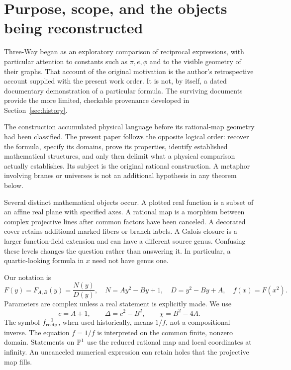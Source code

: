 \section{Purpose, scope, and the objects being reconstructed}\label{sec:intro}

Three-Way began as an exploratory comparison of reciprocal expressions, with particular attention to constants such as \(\pi,e,\phi\) and to the visible geometry of their graphs. That account of the original motivation is the author's retrospective account supplied with the present work order. It is not, by itself, a dated documentary demonstration of a particular formula. The surviving documents provide the more limited, checkable provenance developed in Section~\ref{sec:history}.

The construction accumulated physical language before its rational-map geometry had been classified. The present paper follows the opposite logical order: recover the formula, specify its domains, prove its properties, identify established mathematical structures, and only then delimit what a physical comparison actually establishes. Its subject is the original rational construction. A metaphor involving branes or universes is not an additional hypothesis in any theorem below.

Several distinct mathematical objects occur. A plotted real function is a subset of an affine real plane with specified axes. A rational map is a morphism between complex projective lines after common factors have been canceled. A decorated cover retains additional marked fibers or branch labels. A Galois closure is a larger function-field extension and can have a different source genus. Confusing these levels changes the question rather than answering it. In particular, a quartic-looking formula in \(x\) need not have genus one.

Our notation is
\begin{equation}\label{eq:family}
F(y)=F_{A,B}(y)=\frac{N(y)}{D(y)},\quad
N=Ay^2-By+1,\quad D=y^2-By+A,\quad f(x)=F(x^2).
\end{equation}
Parameters are complex unless a real statement is explicitly made. We use
\begin{equation}\label{eq:parameters}
c=A+1,\qquad \Delta=c^2-B^2,\qquad \chi=B^2-4A.
\end{equation}
The symbol \(f^{-1}_{\rm recip}\), when used historically, means \(1/f\), not a compositional inverse. The equation \(f=1/f\) is interpreted on the common finite, nonzero domain. Statements on \(\mathbb P^1\) use the reduced rational map and local coordinates at infinity. An uncanceled numerical expression can retain holes that the projective map fills.

